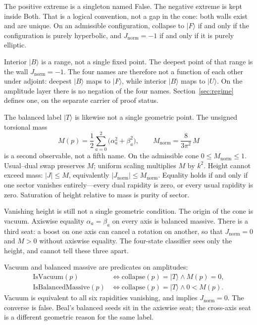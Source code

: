\documentclass[a4paper]{article}
\theoremstyle{definition}
\newcommand{\Jnorm}{J_{\mathrm{norm}}}
\begin{document}
The positive extreme is a singleton named False. The negative extreme
is kept inside Both. That is a logical convention, not a gap in the
cone: both walls exist and are unique. On an admissible configuration,
collapse to \(\lvert F\rangle\) if and only if the configuration is
purely hyperbolic, and \(\Jnorm=-1\) if and only if it is purely
elliptic.

Interior \(\lvert B\rangle\) is a range, not a single fixed point. The
deepest point of that range is the wall \(\Jnorm=-1\). The four names
are therefore not a function of each other under adjoint: deepest
\(\lvert B\rangle\) maps to \(\lvert F\rangle\), while interior
\(\lvert B\rangle\) maps to \(\lvert U\rangle\). On the amplitude layer
there is no negation of the four names. Section~\ref{sec:regime}
defines one, on the separate carrier of proof status.

The balanced label \(\lvert T\rangle\) is likewise not a single
geometric point. The unsigned torsional mass
\[
M(p)=\frac12\sum_{a=0}^{2}\bigl(\alpha_a^2+\beta_a^2\bigr),\qquad
M_{\mathrm{norm}}=\frac{8}{3\pi^2}\,M
\]
is a second observable, not a fifth name. On the admissible cone
\(0\le M_{\mathrm{norm}}\le 1\). Usual--dual swap preserves \(M\);
uniform scaling multiplies \(M\) by \(k^2\). Height cannot exceed mass:
\(\lvert J\rvert\le M\), equivalently \(\lvert\Jnorm\rvert\le M_{\mathrm{norm}}\).
Equality holds if and only if one sector vanishes entirely---every
dual rapidity is zero, or every usual rapidity is zero. Saturation of
height relative to mass is purity of sector.

Vanishing height is still not a single geometric condition. The origin
of the cone is vacuum. Axiswise equality \(\alpha_a=\beta_a\) on every
axis is balanced massive. There is a third seat: a boost on one axis
can cancel a rotation on another, so that \(\Jnorm=0\) and \(M>0\)
without axiswise equality. The four-state classifier sees only the
height, and cannot tell these three apart.

Vacuum and balanced massive are predicates on amplitudes:
\begin{align*}
\mathrm{IsVacuum}(p)
  &\iff \mathrm{collapse}(p)=\lvert T\rangle \wedge M(p)=0,\\
\mathrm{IsBalancedMassive}(p)
  &\iff \mathrm{collapse}(p)=\lvert T\rangle \wedge 0<M(p).
\end{align*}
Vacuum is equivalent to all six rapidities vanishing, and implies
\(\Jnorm=0\). The converse is false. Beal's balanced seeds sit in the
axiswise seat; the cross-axis seat is a different geometric reason for
the same label.
\end{document}
